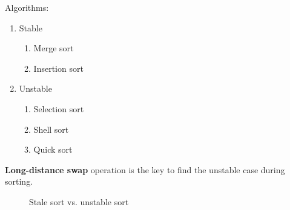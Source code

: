Algorithms:
\begin{enumerate}
\item Stable
\begin{enumerate}
\item Merge sort
\item Insertion sort
\end{enumerate} 
\item Unstable
\begin{enumerate}
\item Selection sort
\item Shell sort
\item Quick sort
\end{enumerate}
\end{enumerate}
\textbf{Long-distance swap} operation is the key to find the unstable case during sorting. 
\begin{figure}[hbtp]
\centering
{}
\caption{Stale sort vs. unstable sort}
\label{fig:trie} 
\end{figure}

